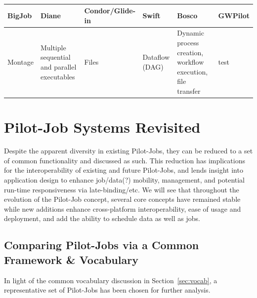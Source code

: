 \documentclass{sig-alternate}
\begin{document}
\begin{landscape}
\begin{table}
\begin{center}
\begin{footnotesize}
\begin{tabular}{|p{3.0cm}|p{3.5cm}|p{2.3cm}|p{1.9cm}|p{3.7cm}|p{2.5cm}|}
\hline {\bf BigJob}
& {\bf Diane}
& {\bf Condor/Glide-in}
& {\bf Swift}
& {\bf Bosco}
& {\bf GWPilot}
\\
\hline

Montage
& Multiple sequential and parallel executables
& Files
& Dataflow (DAG)
& Dynamic process creation, workflow execution, file transfer
& test
\\
\hline

\end{tabular}
\end{footnotesize}
\caption{\label{Tab:AppChars} }
\end{center}
\end{table}
\end{landscape}

\section{Pilot-Job Systems Revisited}
Despite the apparent diversity in existing Pilot-Jobs,
they can be reduced to a set of common functionality and
discussed as such.  This reduction has implications
for the interoperability of existing and future Pilot-Jobs, and
lends insight into application design to enhance job/data(?)
mobility, management, and potential run-time responsiveness via
late-binding/etc.  We will see that throughout the evolution
of the Pilot-Job concept, several core concepts have remained stable
while new additions enhance cross-platform interoperability,
ease of usage and deployment, and add the ability to
schedule data as well as jobs. 

\subsection{Comparing Pilot-Jobs via a Common Framework \& Vocabulary}

In light of the common vocabulary discussion in 
Section~\ref{sec:vocab}, a representative set of Pilot-Jobs
has been chosen for further analysis.  
\end{document}

